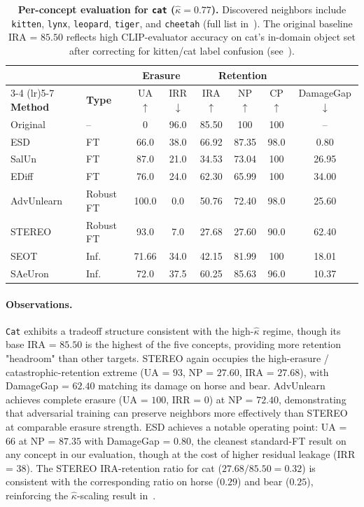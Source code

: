 \begin{table}[h]
\centering
\small
\setlength{\tabcolsep}{5pt}
\begin{tabular}{llcccccc}
\toprule
& & \multicolumn{2}{c}{\textbf{Erasure}} & \multicolumn{3}{c}{\textbf{Retention}} & \\
\cmidrule(lr){3-4} \cmidrule(lr){5-7}
\textbf{Method} & \textbf{Type} & UA$\uparrow$ & IRR$\downarrow$ & IRA$\uparrow$ & NP$\uparrow$ & CP$\uparrow$ & DamageGap$\downarrow$ \\
\midrule
Original    & --          & 0     & 96.0  & 85.50 & 100   & 100   & --    \\
\midrule
ESD         & FT          & 66.0  & 38.0  & 66.92 & 87.35 & 98.0  & 0.80  \\
SalUn       & FT          & 87.0  & 21.0  & 34.53 & 73.04 & 100   & 26.95 \\
EDiff       & FT          & 76.0  & 24.0  & 62.30 & 65.99 & 100   & 34.00 \\
\midrule
AdvUnlearn  & Robust FT   & 100.0 & 0.0   & 50.76 & 72.40 & 98.0  & 25.60 \\
STEREO      & Robust FT   & 93.0  & 7.0   & 27.68 & 27.60 & 90.0  & 62.40 \\
\midrule
SEOT        & Inf.        & 71.66 & 34.0  & 42.15 & 81.99 & 100   & 18.01 \\
SAeUron     & Inf.        & 72.0  & 37.5  & 60.25 & 85.63 & 96.0  & 10.37 \\
\bottomrule
\end{tabular}
\caption{\textbf{Per-concept evaluation for \texttt{cat} ($\hat\kappa = 0.77$).} Discovered neighbors include \texttt{kitten}, \texttt{lynx}, \texttt{leopard}, \texttt{tiger}, and \texttt{cheetah} (full list in~). The original baseline IRA = $85.50$ reflects high CLIP-evaluator accuracy on cat's in-domain object set after correcting for kitten/cat label confusion (see~).}
\label{tab:per_concept_cat}
\end{table}

\paragraph{Observations.}
\texttt{Cat} exhibits a tradeoff structure consistent with the high-$\hat\kappa$ regime, though its base IRA = $85.50$ is the highest of the five concepts, providing more retention "headroom" than other targets. STEREO again occupies the high-erasure / catastrophic-retention extreme (UA = $93$, NP = $27.60$, IRA = $27.68$), with DamageGap = $62.40$ matching its damage on horse and bear. AdvUnlearn achieves complete erasure (UA = $100$, IRR = $0$) at NP = $72.40$, demonstrating that adversarial training can preserve neighbors more effectively than STEREO at comparable erasure strength. ESD achieves a notable operating point: UA = $66$ at NP = $87.35$ with DamageGap = $0.80$, the cleanest standard-FT result on any concept in our evaluation, though at the cost of higher residual leakage (IRR = $38$). The STEREO IRA-retention ratio for cat ($27.68 / 85.50 = 0.32$) is consistent with the corresponding ratio on horse ($0.29$) and bear ($0.25$), reinforcing the $\hat\kappa$-scaling result in~.

